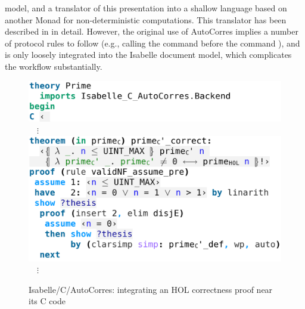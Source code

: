 \begin{isabellebody}
\begin{isamarkuptext}
model, and a translator of this presentation into a shallow language based on another Monad for
non-deterministic computations. This translator has been described in \cite{DBLP:conf/pldi/GreenawayLAK14,DBLP:conf/tphol/WinwoodKSACN09} in detail. However, the
original use of AutoCorres implies a number of protocol rules to follow (e.g., calling the command
 before the command
), and is only loosely integrated into the Isabelle document
model, which complicates the workflow substantially.%
\end{isamarkuptext}\isamarkuptrue%
%
\begin{isamarkuptext}%
\begin{figure}
  \centering
\begin{minipage}{0.48\textwidth}
\includegraphics[width=\textwidth]{figures/A-C-Source80}\vspace{-3pt}\hfill\allowbreak%
\vspace{0pt}$\quad\vdots$\vspace{2pt}\hfill\allowbreak%
\includegraphics[width=\textwidth]{figures/A-C-Source8}\vspace{-3pt}\hfill\allowbreak%
\vspace{0pt}$\quad\vdots$\vspace{2pt}\hfill\allowbreak%
\end{minipage}
  \caption{Isabelle/C/AutoCorres: integrating an HOL correctness proof near its C code}
  \label{fig:autocorres-c}

\end{figure}
\end{isamarkuptext}
\end{isabellebody}
